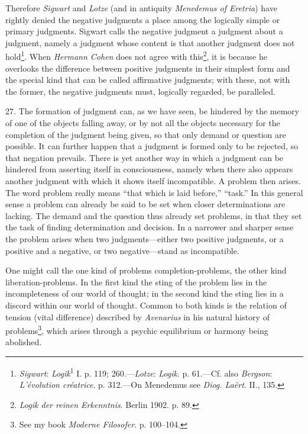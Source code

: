 \documentclass[12pt,a4paper]{book}
\newcommand{\opage}[1]{\marginnote{\footnotesize\textit{[#1]}}}
\begin{document}
Therefore \emph{Sigwart} and \emph{Lotze} (and in antiquity
\emph{Menedemus of Eretria}) have rightly denied the negative judgments a
place among the logically simple or primary judgments. Sigwart calls the
negative judgment a judgment about a judgment, namely a judgment whose
content is that another judgment does not hold\footnote{\emph{Sigwart}:
\emph{Logik}\textsuperscript{1} I. p. 119; 260.---\emph{Lotze}:
\emph{Logik}. p. 61.---Cf. also \emph{Bergson}: \emph{L'évolution
créatrice}. p. 312.---On Menedemus see \emph{Diog. Laërt}. II., 135.}.
When \emph{Hermann Cohen} does not agree with this\footnote{\emph{Logik
der reinen Erkenntnis}. Berlin 1902. p. 89.}, it is because he overlooks
the difference between positive judgments in their simplest form and the
special kind that can be called affirmative judgments; with these, not
with the former, the negative judgments must, logically regarded, be
paralleled.

27. The formation of judgment can, as we have seen, be hindered by the
memory of one of the objects falling away, or by not all the objects
necessary for the completion of the judgment being given, so that only
demand or question are possible. It can further happen that a judgment is
formed only to be rejected, so that negation prevails. There is yet
another way in which a judgment can be hindered from asserting itself in
consciousness, namely when there also appears another judgment with which
it shows itself incompatible. A problem then arises. The word problem
really means ``that which is laid before,'' ``task.'' In this general
sense a problem can already be said to be set when closer determinations
are lacking. The demand and the question thus already set problems, in
that they set the task of finding determination and decision. In a
narrower and sharper sense the problem arises when two judgments---either
two positive judgments, or a positive and a negative, or two
negative---stand as incompatible.

One might call the one kind of problems completion-problems, the other
kind liberation-problems. In the \opage{79}first kind the sting of the problem lies
in the incompleteness of our world of thought; in the second kind the
sting lies in a discord within our world of thought. Common to both kinds
is the relation of tension (vital difference) described by \emph{Avenarius}
in his natural history of problems\footnote{See my book \emph{Moderne
Filosofer}. p. 100--104.}, which arises through a psychic equilibrium or
harmony being abolished.
\end{document}
